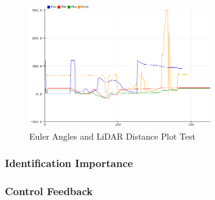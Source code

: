 \begin{figure}[H]
	\centering
	\includegraphics[width=0.7\textwidth]{./Images/serial-plotter.png}
	\caption{\label{fig:serial-plot}Euler Angles and LiDAR Distance Plot Test}
\end{figure}

\subsubsection{Identification Importance}


\subsubsection{Control Feedback}


